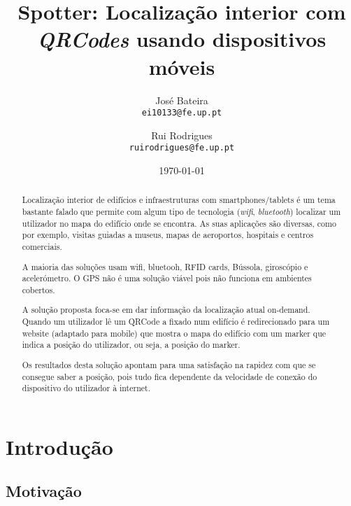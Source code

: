 \documentclass[twocolumn,twoside,11pt]{article}
\title{\vspace{-15mm}\fontsize{24pt}{10pt}\selectfont\textbf{
  Spotter: Localização interior com \emph{QRCodes} usando dispositivos móveis
}} %
\author{José Bateira\\
\small \texttt{ei10133@fe.up.pt}\\
\and
Rui Rodrigues\\
\small \texttt{ruirodrigues@fe.up.pt}
\vspace{-5mm}
}
\date{\today}
\begin{document}
\maketitle
\thispagestyle{plain}            %


\begin{abstract}
Localização interior de edifícios e infraestruturas com smartphones/tablets é um tema bastante falado que permite com algum tipo de tecnologia (\emph{wifi}, \emph{bluetooth}) localizar um utilizador no mapa do edifício onde se encontra.
As suas aplicações são diversas, como por exemplo, visitas guiadas a museus, mapas de aeroportos, hospitais e centros comerciais.

A maioria das soluções usam wifi, bluetooh, RFID cards, Bússola, giroscópio e acelerómetro.
O GPS não é uma solução viável pois não funciona em ambientes cobertos.

A solução proposta foca-se em dar informação da localização atual on-demand. Quando um utilizador lê um QRCode a fixado num edifício é redirecionado para um website (adaptado para mobile) que mostra o mapa do edifício com um marker que indica a posição do utilizador, ou seja, a posição do marker.

Os resultados desta solução apontam para uma satisfação na rapidez com que se consegue saber a posição, pois tudo fica dependente da velocidade de conexão do dispositivo do utilizador à internet.
\end{abstract}


\section{Introdução}\label{sec:intro}

\lipsum[3]

\subsection{Motivação} %
\label{sub:motivacao}
\lipsum[1]
\end{document}
